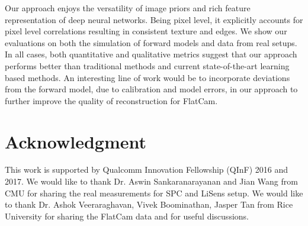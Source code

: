 \documentclass[journal,twoside]{IEEEtran}
\begin{document}
Our approach enjoys the versatility of image priors and rich feature representation of deep neural networks. Being pixel level, it explicitly accounts for pixel level correlations resulting in consistent texture and edges. We show our evaluations on both the simulation of forward models and data from real setups. In all cases, both quantitative and qualitative metrics suggest that our approach performs better than traditional methods and current state-of-the-art learning based methods. An interesting line of work would be to incorporate deviations from the forward model, due to calibration and model errors, in our approach to further improve the quality of reconstruction for FlatCam. 

\section*{Acknowledgment}
This work is supported by Qualcomm Innovation Fellowship (QInF) 2016 and 2017. We would like to thank Dr. Aswin Sankaranarayanan and Jian Wang from CMU  for sharing the real measurements for SPC and LiSens setup. We would like to thank Dr. Ashok Veeraraghavan, Vivek Boominathan, Jasper Tan from Rice University for sharing the FlatCam data and for useful discussions. 
\end{document}
